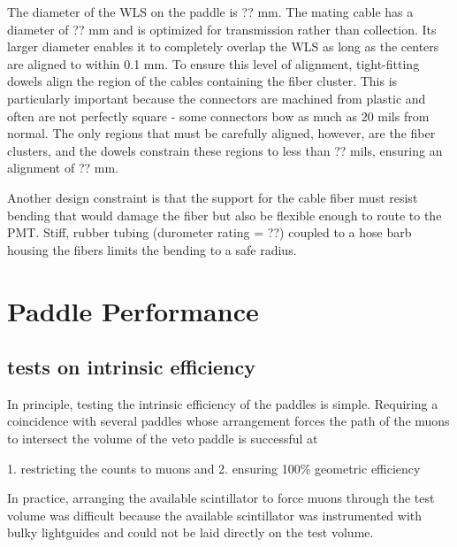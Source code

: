 The diameter of the WLS on the paddle is ?? mm.  The mating cable has a diameter of ?? mm and is optimized for transmission rather than collection.  Its larger diameter enables it to completely overlap the WLS as long as the centers are aligned to within 0.1 mm.  To ensure this level of alignment, tight-fitting dowels align the region of the cables containing the fiber cluster.  This is particularly important because the connectors are machined from plastic and often are not perfectly square - some connectors bow as much as 20 mils from normal.  The only regions that must be carefully aligned, however, are the fiber clusters, and the dowels constrain these regions to less than ?? mils, ensuring an alignment of ?? mm.  

Another design constraint is that the support for the cable fiber must resist bending that would damage the fiber but also be flexible enough to route to the PMT.  Stiff, rubber tubing (durometer rating = ??) coupled to a hose barb housing the fibers limits the bending to a safe radius.



\section{Paddle Performance}
\subsection{tests on intrinsic efficiency}

In principle, testing the intrinsic efficiency of the paddles is simple.  Requiring a coincidence with several paddles whose arrangement forces the path of the muons to intersect the volume of the veto paddle is successful at 

1. restricting the counts to muons and
2. ensuring 100\% geometric efficiency

In practice, arranging the available scintillator to force muons through the test volume was difficult because the available scintillator was instrumented with bulky lightguides and could not be laid directly on the test volume.

